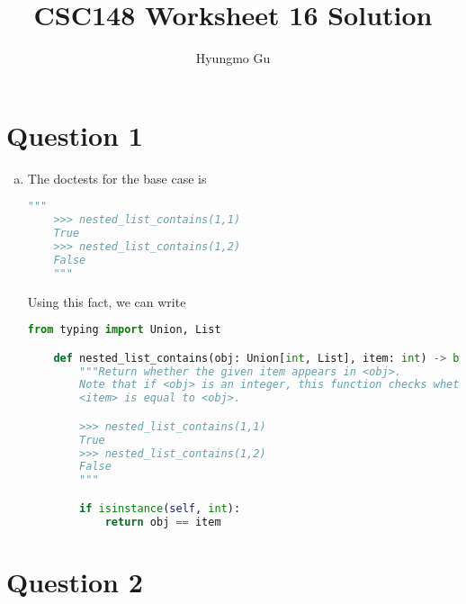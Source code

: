\documentclass[12pt]{article}
\begin{document}
\title{CSC148 Worksheet 16 Solution}
\author{Hyungmo Gu}
\maketitle

\section*{Question 1}
\begin{enumerate}[a.]
    \item

    The doctests for the base case is

    \begin{lstlisting}[language=python]
    """
    >>> nested_list_contains(1,1)
    True
    >>> nested_list_contains(1,2)
    False
    """
    \end{lstlisting}

    \bigskip

    Using this fact, we can write

    \begin{lstlisting}[language=python,caption={worksheet\_16\_q1a\_solution}]
    from typing import Union, List

    def nested_list_contains(obj: Union[int, List], item: int) -> bool:
        """Return whether the given item appears in <obj>.
        Note that if <obj> is an integer, this function checks whether
        <item> is equal to <obj>.

        >>> nested_list_contains(1,1)
        True
        >>> nested_list_contains(1,2)
        False
        """

        if isinstance(self, int):
            return obj == item
    \end{lstlisting}
\end{enumerate}

\section*{Question 2}
\end{document}
